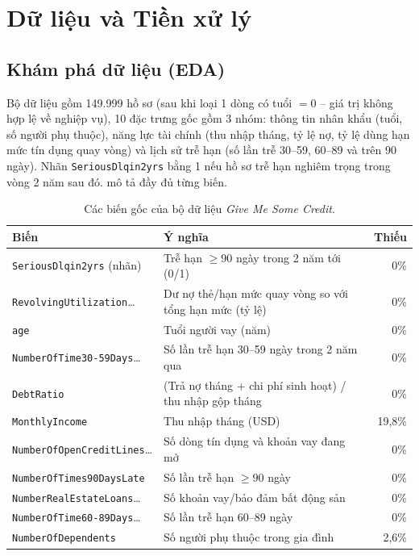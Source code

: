 \documentclass[12pt,a4paper,oneside]{report}
\theoremstyle{vnplain}
\theoremstyle{vndef}
\begin{document}
\chapter{Dữ liệu và Tiền xử lý}\label{ch:dulieu}

\section{Khám phá dữ liệu (EDA)}
Bộ dữ liệu gồm 149.999 hồ sơ (sau khi loại 1 dòng có tuổi $=0$ -- giá trị không hợp lệ về
nghiệp vụ), 10 đặc trưng gốc gồm 3 nhóm: thông tin nhân khẩu (tuổi, số người phụ thuộc),
năng lực tài chính (thu nhập tháng, tỷ lệ nợ, tỷ lệ dùng hạn mức tín dụng quay vòng) và
lịch sử trễ hạn (số lần trễ 30--59, 60--89 và trên 90 ngày). Nhãn
\texttt{SeriousDlqin2yrs} bằng 1 nếu hồ sơ trễ hạn nghiêm trọng trong vòng 2 năm sau đó.
 mô tả đầy đủ từng biến.

\begin{table}[htbp]\centering\small
\caption{Các biến gốc của bộ dữ liệu \emph{Give Me Some Credit}.}
\label{tab:bien}
\begin{tabular}{p{5.6cm} p{6.6cm} r}
\toprule
\textbf{Biến} & \textbf{Ý nghĩa} & \textbf{Thiếu}\\
\midrule
\texttt{SeriousDlqin2yrs} (nhãn) & Trễ hạn $\ge 90$ ngày trong 2 năm tới (0/1) & 0\%\\
\texttt{RevolvingUtilization}\ldots & Dư nợ thẻ/hạn mức quay vòng so với tổng hạn mức (tỷ lệ) & 0\%\\
\texttt{age} & Tuổi người vay (năm) & 0\%\\
\texttt{NumberOfTime30-59Days}\ldots & Số lần trễ hạn 30--59 ngày trong 2 năm qua & 0\%\\
\texttt{DebtRatio} & (Trả nợ tháng + chi phí sinh hoạt) / thu nhập gộp tháng & 0\%\\
\texttt{MonthlyIncome} & Thu nhập tháng (USD) & 19,8\%\\
\texttt{NumberOfOpenCreditLines}\ldots & Số dòng tín dụng và khoản vay đang mở & 0\%\\
\texttt{NumberOfTimes90DaysLate} & Số lần trễ hạn $\ge 90$ ngày & 0\%\\
\texttt{NumberRealEstateLoans}\ldots & Số khoản vay/bảo đảm bất động sản & 0\%\\
\texttt{NumberOfTime60-89Days}\ldots & Số lần trễ hạn 60--89 ngày & 0\%\\
\texttt{NumberOfDependents} & Số người phụ thuộc trong gia đình & 2,6\%\\
\bottomrule
\end{tabular}
\end{table}
\end{document}
